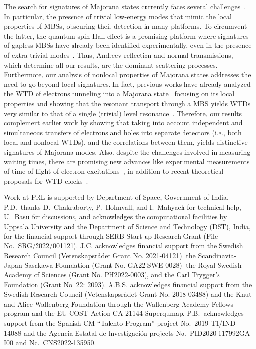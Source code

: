 \documentclass[aps,prl,amsmath,twocolumn,floatfix,superscriptaddress,longbibliography,footinbib]{revtex4-1}
\begin{document}
The search for signatures of Majorana states currently faces several challenges~\cite{Frolov2019,Prada2020,Frolov2021,Kleinherbers2023,Egues_2023}. In particular, the presence of trivial low-energy modes that mimic the local properties of MBSs, obscuring their detection in many platforms. 
To circumvent the latter, the quantum spin Hall effect is a promising platform where signatures of gapless MBSs have already been identified experimentally, even in the presence of extra trivial modes~\cite{Wiedenmann2016,Bocquillon2017,Deacon2017}. Thus, Andreev reflection and normal transmissions, which determine all our results, are the dominant scattering processes.
%
Furthermore, our analysis of nonlocal properties of Majorana states addresses the need to go beyond local signatures. In fact, previous works have already analyzed the WTD of electrons tunneling into a Majorana state~\cite{Chevallier2016,Mi2018,Fu2022,Schulz2022} focusing on its local properties and showing that the resonant transport through a MBS yields WTDs very similar to that of a single (trivial) level resonance~\cite{Haack2014,Mi2018}. 
Therefore, our results complement earlier work by showing that taking into account independent and simultaneous transfers of electrons and holes into separate detectors (i.e., both local and nonlocal WTDs), and the correlations between them, yields distinctive signatures of Majorana modes. Also, despite the challenges involved in measuring waiting times, there are promising new advances like experimental measurements of time-of-flight of electron excitations~\cite{Kataoka2016,Roussely2018}, in addition to recent theoretical proposals for WTD clocks~\cite{Haack2015,Dasenbrook2016}. 

\acknowledgments
Work at PRL is supported by Department of Space, Government of India. P.D.~thanks D.~Chakraborty, P.~Holmvall, and I.~Mahyaeh for technical help, U.~Basu for discussions, and acknowledges the computational facilities by Uppsala University and the Department of Science and Technology (DST), India, for the financial support through SERB Start-up Research Grant (File No.~SRG/2022/001121). 
J.C. acknowledges financial support from the Swedish Research Council (Vetenskapsr{\aa}det Grant No. 2021-04121), the Scandinavia-Japan Sasakawa Foundation (Grant No. GA22-SWE-0028), the Royal Swedish Academy of Sciences (Grant No. PH2022-0003), and the Carl Trygger’s Foundation (Grant No. 22: 2093). 
A.B.S. acknowledges financial support from the Swedish Research Council (Vetenskapsr{\aa}det Grant No. 2018-03488) and the Knut and Alice Wallenberg Foundation through the Wallenberg Academy Fellows program and the EU-COST Action CA-21144 Superqumap. 
P.B.~acknowledges support from the Spanish CM ``Talento Program'' project No.~2019-T1/IND-14088 and the Agencia Estatal de Investigaci\'on projects No.~PID2020-117992GA-I00 and No.~CNS2022-135950. 
\end{document}
